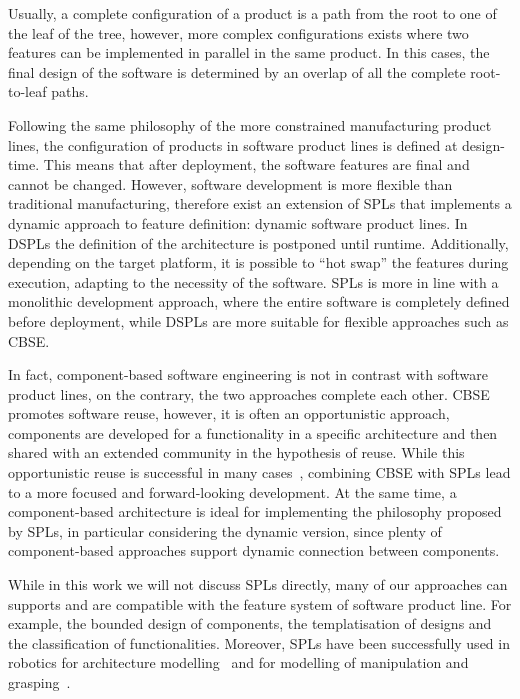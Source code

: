 Usually, a complete configuration of a product is a path from the root to one of the leaf of the tree, however, more complex configurations exists where two features can be implemented in parallel in the same product. In this cases, the final design of the software is determined by an overlap of all the complete root-to-leaf paths.

Following the same philosophy of the more constrained manufacturing product lines, the configuration of products in software product lines is defined at design-time. This means that after deployment, the software features are final and cannot be changed. However, software development is more flexible than traditional manufacturing, therefore exist an extension of SPLs that implements a dynamic approach to feature definition: dynamic software product lines. In DSPLs the definition of the architecture is postponed until runtime. Additionally, depending on the target platform, it is possible to ``hot swap'' the features during execution, adapting to the necessity of the software. SPLs is more in line with a monolithic development approach, where the entire software is completely defined before deployment, while DSPLs are more suitable for flexible approaches such as CBSE.

In fact, component-based software engineering is not in contrast with software product lines, on the contrary, the two approaches complete each other. CBSE promotes software reuse, however, it is often an opportunistic approach, components are developed for a functionality in a specific architecture and then shared with an extended community in the hypothesis of reuse. While this opportunistic reuse is successful in many cases~\cite{jansen2008pragmatic}, combining CBSE with SPLs lead to a more focused and forward-looking development. At the same time, a component-based architecture is ideal for implementing the philosophy proposed by SPLs, in particular considering the dynamic version, since plenty of component-based approaches support dynamic connection between components.

While in this work we will not discuss SPLs directly, many of our approaches can supports and are compatible with the feature system of software product line. For example, the bounded design of components, the templatisation of designs and the classification of functionalities. Moreover, SPLs have been successfully used in robotics for architecture modelling~\cite{gherardi2014modeling, brugali2016hyperflex} and for modelling of manipulation and grasping~\cite{baumgartl2013towards}.

